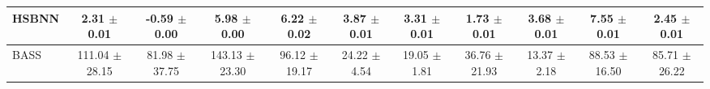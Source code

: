 \begin{table}[t]
{\begin{tabular}{lcccccccccc}
\midrule
\shortstack[l]{HSBNN \\ {}} & \shortstack{2.31 \\ $\pm$ 0.01} & \shortstack{-0.59 \\ $\pm$ 0.00} & \shortstack{5.98 \\ $\pm$ 0.00} & \shortstack{6.22 \\ $\pm$ 0.02} & \shortstack{3.87 \\ $\pm$ 0.01} & \shortstack{3.31 \\ $\pm$ 0.01} & \shortstack{1.73 \\ $\pm$ 0.01} & \shortstack{3.68 \\ $\pm$ 0.01} & \shortstack{7.55 \\ $\pm$ 0.01} & \shortstack{\textbf{2.45} \\ $\pm$ 0.01} \\
\midrule
\shortstack[l]{BASS \\ {}} & \shortstack{111.04 \\ $\pm$ 28.15} & \shortstack{81.98 \\ $\pm$ 37.75} & \shortstack{143.13 \\ $\pm$ 23.30} & \shortstack{96.12 \\ $\pm$ 19.17} & \shortstack{24.22 \\ $\pm$ 4.54} & \shortstack{19.05 \\ $\pm$ 1.81} & \shortstack{36.76 \\ $\pm$ 21.93} & \shortstack{13.37 \\ $\pm$ 2.18} & \shortstack{88.53 \\ $\pm$ 16.50} & \shortstack{85.71 \\ $\pm$ 26.22} \\
\bottomrule
\end{tabular}
}
\end{table}
